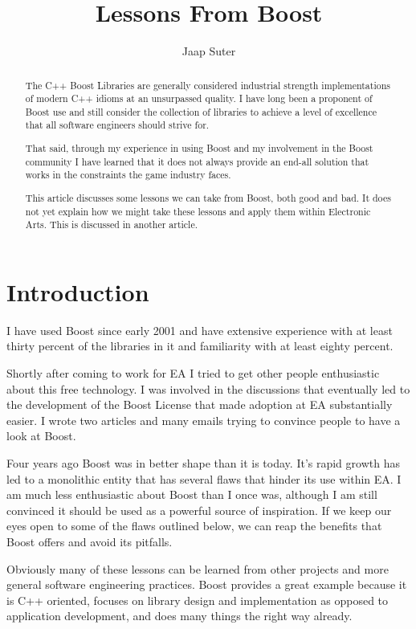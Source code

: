 \documentclass[twocolumn]{paper}
\begin{document}
\title{Lessons From Boost}
\author{Jaap Suter}
\maketitle

\begin{abstract}
The C++ Boost Libraries \cite{bib:boost} are generally considered
industrial strength implementations of modern C++ idioms at an
unsurpassed quality. I have long been a proponent of Boost use and
still consider the collection of libraries to achieve a level of
excellence that all software engineers should strive for.

That said, through my experience in using Boost and my involvement
in the Boost community I have learned that it does not always
provide an end-all solution that works in the constraints the game
industry faces.

This article discusses some lessons we can take from Boost, both
good and bad. It does not yet explain how we might take these
lessons and apply them within Electronic Arts. This is discussed in
another article.
\end{abstract}

\section{Introduction}

I have used Boost since early 2001 and have extensive experience
with at least thirty percent of the libraries in it and familiarity
with at least eighty percent.

Shortly after coming to work for EA I tried to get other people
enthusiastic about this free technology. I was involved in the
discussions that eventually led to the development of the Boost
License that made adoption at EA substantially easier. I wrote two
articles and many emails trying to convince people to have a look at
Boost.

Four years ago Boost was in better shape than it is today. It's
rapid growth has led to a monolithic entity that has several flaws
that hinder its use within EA. I am much less enthusiastic about
Boost than I once was, although I am still convinced it should be
used as a powerful source of inspiration. If we keep our eyes open
to some of the flaws outlined below, we can reap the benefits that
Boost offers and avoid its pitfalls.

Obviously many of these lessons can be learned from other projects
and more general software engineering practices. Boost provides a
great example because it is C++ oriented, focuses on library design
and implementation as opposed to application development, and does
many things the right way already.
\end{document}
